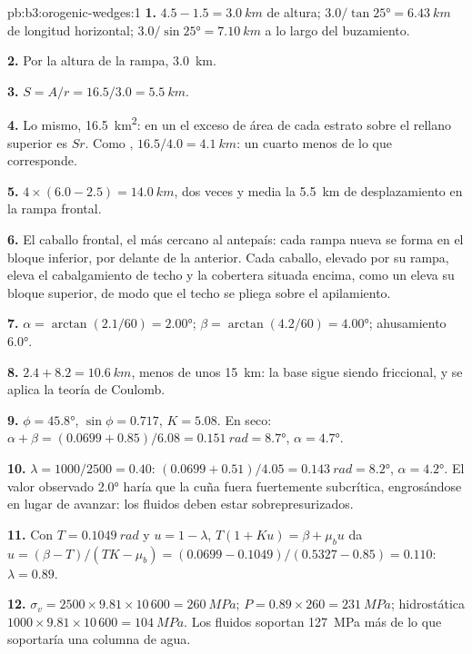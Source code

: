 \begin{solution}{pb:b3:orogenic-wedges:1}
\textbf{1.} $4.5 - 1.5 = \qty{3.0}{km}$ de altura; $3.0/\tan\ang{25} =
\qty{6.43}{km}$ de longitud horizontal; $3.0/\sin\ang{25} = \qty{7.10}{km}$ a lo largo
del buzamiento.

\textbf{2.} Por la altura de la rampa, \qty{3.0}{km}.

\textbf{3.} $S = A/r = 16.5/3.0 = \qty{5.5}{km}$.

\textbf{4.} Lo mismo, \qty{16.5}{km^2}: en un  el exceso de área
de cada estrato sobre el rellano superior es $Sr$. Como , $16.5/4.0 =
\qty{4.1}{km}$: un cuarto menos de lo que corresponde.

\textbf{5.} $4\times(6.0 - 2.5) = \qty{14.0}{km}$, dos veces y media la
\qty{5.5}{km} de desplazamiento en la rampa frontal.

\textbf{6.} El caballo frontal, el más cercano al antepaís: cada rampa nueva
se forma en el bloque inferior, por delante de la anterior. Cada caballo, elevado por su rampa,
eleva el cabalgamiento de techo y la cobertera situada encima, como un  eleva su
bloque superior, de modo que el techo se pliega sobre el apilamiento.

\textbf{7.} $\alpha = \arctan(2.1/60) = \ang{2.00}$; $\beta =
\arctan(4.2/60) = \ang{4.00}$; ahusamiento \ang{6.0}.

\textbf{8.} $2.4 + 8.2 = \qty{10.6}{km}$, menos de unos \qty{15}{km}: la
base sigue siendo friccional, y se aplica la teoría de Coulomb.

\textbf{9.} $\phi = \ang{45.8}$, $\sin\phi = 0.717$, $K = 5.08$. En seco:
$\alpha + \beta = (0.0699 + 0.85)/6.08 = \qty{0.151}{rad} = \ang{8.7}$,
$\alpha = \ang{4.7}$.

\textbf{10.} $\lambda = 1000/2500 = 0.40$: $(0.0699 + 0.51)/4.05 =
\qty{0.143}{rad} = \ang{8.2}$, $\alpha = \ang{4.2}$. El valor observado \ang{2.0}
haría que la cuña fuera fuertemente subcrítica, engrosándose en lugar de avanzar:
los fluidos deben estar sobrepresurizados.

\textbf{11.} Con $T = \qty{0.1049}{rad}$ y $u = 1 - \lambda$, $T(1 + Ku) =
\beta + \mu_bu$ da $u = (\beta - T)/(TK - \mu_b) = (0.0699 -
0.1049)/(0.5327 - 0.85) = 0.110$: $\lambda = 0.89$.

\textbf{12.} $\sigma_v = 2500\times9.81\times10\,600 = \qty{260}{MPa}$; $P =
0.89\times260 = \qty{231}{MPa}$; hidrostática $1000\times9.81\times10\,600 =
\qty{104}{MPa}$. Los fluidos soportan \qty{127}{MPa} más de lo que soportaría
una columna de agua.


\end{solution}
